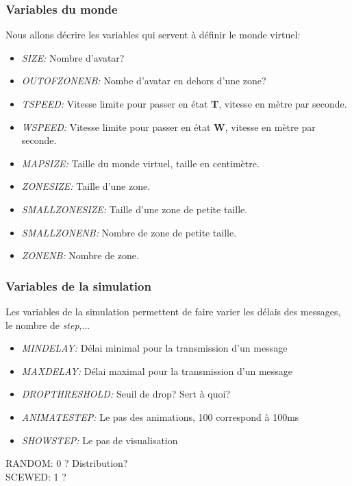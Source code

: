 \documentclass[11pt,a4paper]{article}
\begin{document}
\subsubsection{Variables du monde}
Nous allons décrire les variables qui servent à définir le monde virtuel:
\begin{itemize}
	\renewcommand{\labelitemi}{$\bullet$}
	\item \textit{SIZE:} Nombre d'avatar? 
	\item \textit{OUTOFZONENB:} Nombe d'avatar en dehors d'une zone?
	\item \textit{TSPEED:} Vitesse limite pour passer en état \textbf{T}, vitesse en mètre par seconde.
	\item \textit{WSPEED:} Vitesse limite pour passer en état \textbf{W}, vitesse en mètre par seconde.
	\item \textit{MAPSIZE:} Taille du monde virtuel, taille en centimètre.
	\item \textit{ZONESIZE:} Taille d'une zone.
	\item \textit{SMALLZONESIZE:} Taille d'une zone de petite taille.
	\item \textit{SMALLZONENB:} Nombre de zone de petite taille.
	\item \textit{ZONENB:} Nombre de zone.
\end{itemize}

\subsubsection{Variables de la simulation}
Les variables de la simulation permettent de faire varier les délais des messages, le nombre de \textit{step},...
\begin{itemize}
	\renewcommand{\labelitemi}{$\bullet$} 
	\item \textit{MINDELAY:} Délai minimal pour la transmission d'un message
	\item \textit{MAXDELAY:} Délai maximal pour la transmission d'un message
	\item \textit{DROPTHRESHOLD:} Seuil de drop? Sert à quoi?
	\item \textit{ANIMATESTEP:} Le pas des animations, 100 correspond à 100ms 
	\item \textit{SHOWSTEP:} Le pas de visualisation
\end{itemize}
RANDOM: 0 ? Distribution?\\
SCEWED: 1 ?\\
\end{document}
